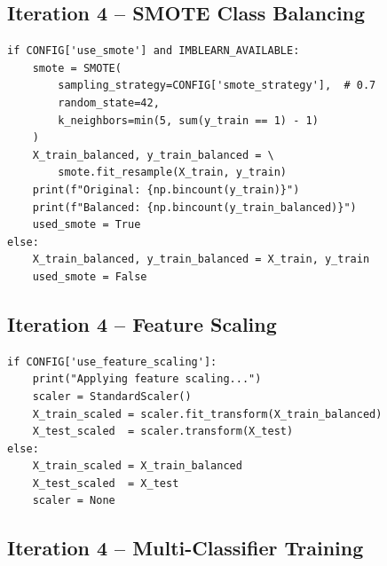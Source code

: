 \documentclass[11pt, titlepage, bibliography=totoc]{scrreprt}
\begin{document}
\subsection*{Iteration 4 -- SMOTE Class Balancing}

\begin{lstlisting}[label=lst:smote,
  caption={SMOTE oversampling applied to the training set in Iteration~4.}]
if CONFIG['use_smote'] and IMBLEARN_AVAILABLE:
    smote = SMOTE(
        sampling_strategy=CONFIG['smote_strategy'],  # 0.7
        random_state=42,
        k_neighbors=min(5, sum(y_train == 1) - 1)
    )
    X_train_balanced, y_train_balanced = \
        smote.fit_resample(X_train, y_train)
    print(f"Original: {np.bincount(y_train)}")
    print(f"Balanced: {np.bincount(y_train_balanced)}")
    used_smote = True
else:
    X_train_balanced, y_train_balanced = X_train, y_train
    used_smote = False
\end{lstlisting}

\subsection*{Iteration 4 -- Feature Scaling}

\begin{lstlisting}[label=lst:feature-scaling,
  caption={StandardScaler feature normalisation applied after SMOTE in Iteration~4.}]
if CONFIG['use_feature_scaling']:
    print("Applying feature scaling...")
    scaler = StandardScaler()
    X_train_scaled = scaler.fit_transform(X_train_balanced)
    X_test_scaled  = scaler.transform(X_test)
else:
    X_train_scaled = X_train_balanced
    X_test_scaled  = X_test
    scaler = None
\end{lstlisting}

\subsection*{Iteration 4 -- Multi-Classifier Training}
\end{document}
